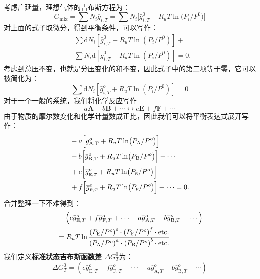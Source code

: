 \documentclass[8pt,landscape]{article}
\begin{document}
\begin{multicols}{3}
{
    \scriptsize\color{gray}
    考虑广延量，理想气体的吉布斯方程为：
    \[
        G_{\mathrm{mix}}=\sum N_{i}\overline{{{g}}}_{i,T}=\sum N_{i}\bigl[\bar{g}_{i,T}^{0}+R_{u}T\ln\bigl(P_{i}/P^{0}\bigr)\bigr]
    \]
    对上面的式子取微分，得到平衡条件，可以写作：
    \[
        \begin{aligned}
        &\sum{\mathrm{d}{N}}_{i}\left[\bar{g}_{i,T}^{0}+R_{u}T\ln\left(P_{i}/P^{0}\right)\right]+\\
        &\sum{N}_{i}\mathrm{d}\left[\bar{g}_{i,T}^{0}+R_{u}T\ln\left(P_{i}/P^{0}\right)\right]=0.
        \end{aligned}
    \]
    考虑到总压不变，也就是分压变化的和不变，因此式子中的第二项等于零，它可以被简化为：
    \[\sum{\mathrm{d}{N}}_{i}\left[\bar{g}_{i,T}^{o}+R_{u}T\ln\left(P_{i}/P^{0}\right)\right]=0\]
    对于一个一般的系统，我们将化学反应写作
    \[a\mathbf{A}+b\mathbf{B}+\cdots\leftrightarrow e\mathbf{E}+f\mathbf{F}+\cdots\]
    由于物质的摩尔数变化和化学计量数成正比，因此我们可以将平衡表达式展开写作：
    \[
        \begin{aligned}
            &-a\Bigl[\bar{g}_\mathrm{A,T}^{o}+R_{u}T\ln\bigl(P_{\mathrm{A}}/P^{o}\bigr)\Bigr]\\
            &-b\Bigl[\bar{g}_{\mathrm{B,T}}^{o}+R_{u}T\ln\bigl(P_{\mathrm{B}}/P^{o}\bigr)\Bigr]-\cdots\\
            &+e\Bigl[\overline{{{g}}}_{\scriptscriptstyle\mathrm{E,}T}^{o}+R_{u}T\ln\bigl(P_{\scriptscriptstyle\mathrm{E}}/P^{o}\bigr)\Bigr]\\
            &+f\Bigl[\overline{{{g}}}_{\scriptscriptstyle\mathrm{F,}T}^{o}+R_{u}T\ln\bigl(P_{\scriptscriptstyle\mathrm{F}}/P^{o}\bigr)\Bigr]+\cdots=0.
        \end{aligned}
    \]
    合并整理一下不难得到：
    \[
        \begin{aligned}
            &-\Bigl(e\bar{g}_{\mathrm{E},T}^{o}+f\overline{{{g}}}_{\mathrm{F},T}^{o}+\cdot\cdot\cdot-a\overline{{{g}}}_{\mathrm{A},T}^{o}-b\overline{{{g}}}_{\mathrm{B},T}^{o}-\cdots\Bigr)\\
            &=R_{u}T\ln{\frac{\left(P_{\mathrm{E}}/P^{o}\right)^{e}\cdot\left(P_{\mathrm{F}}/P^{o}\right)^{f}\cdot\mathrm{etc.}}{\left(P_{\mathrm{A}}/P^{o}\right)^{a}\cdot\left(P_{\mathrm{B}}/P^{o}\right)^{b}\cdot\mathrm{etc.}}}
        \end{aligned}\]
}
我们定义\textbf{标准状态吉布斯函数差 $\Delta G_T^0$}为：
\begin{equation}
    \Delta G_T^0 = (e\bar{g}_{\mathrm{E},T}^{o}+f\overline{{{g}}}_{\mathrm{F},T}^{o}+\cdot\cdot\cdot-a\overline{{{g}}}_{\mathrm{A},T}^{o}-b\overline{{{g}}}_{\mathrm{B},T}^{o}-\cdots)

\end{equation}
\end{multicols}
\end{document}

